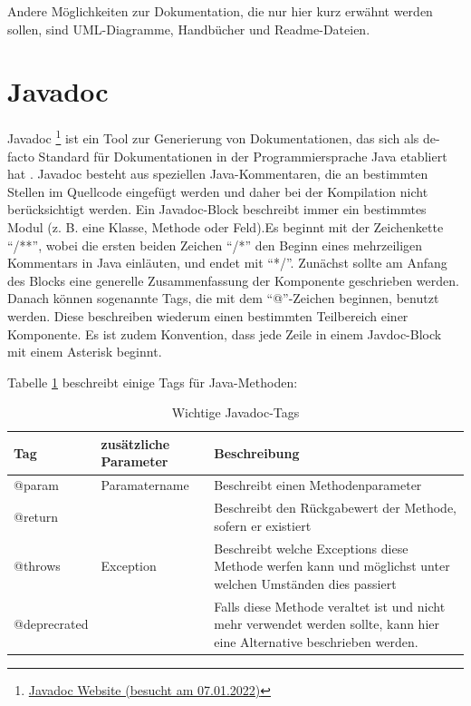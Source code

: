 Andere Möglichkeiten zur Dokumentation, die nur hier kurz erwähnt werden sollen, sind UML-Diagramme, Handbücher und  Readme-Dateien.



\section{Javadoc}
Javadoc \footnote{\href{https://www.oracle.com/java/technologies/javase/javadoc-tool.html}{Javadoc Website (besucht am 07.01.2022)} } ist ein Tool zur Generierung von Dokumentationen, das sich als de-facto Standard für Dokumentationen in der Programmiersprache Java etabliert hat \cite[S. 249]{JavadocViolationsandTheirEvolutioninOpen-SourceSoftware}.  Javadoc besteht aus speziellen Java-Kommentaren, die an bestimmten Stellen im Quellcode eingefügt werden und daher bei der Kompilation nicht berücksichtigt werden. Ein Javadoc-Block beschreibt immer ein bestimmtes Modul (z. B. eine Klasse, Methode oder Feld).Es beginnt mit der Zeichenkette \enquote{/**}, wobei die ersten beiden Zeichen \enquote{/*} den Beginn eines mehrzeiligen Kommentars in Java einläuten, und endet mit \enquote{*/}. Zunächst sollte am Anfang des Blocks eine generelle Zusammenfassung der Komponente geschrieben werden. Danach können sogenannte Tags, die mit dem \enquote{@}-Zeichen beginnen, benutzt werden. Diese beschreiben wiederum einen bestimmten Teilbereich einer Komponente. Es ist zudem Konvention, dass jede Zeile in einem Javdoc-Block mit einem Asterisk beginnt. 

Tabelle \ref{tab:table_javadoc_method} beschreibt einige Tags für Java-Methoden:
\begin{table}[h]
    \centering
    \begin{tabular}{m{4cm}|m{4cm}|m{7cm}}
    Tag & zusätzliche Parameter &Beschreibung\\
    \hline
        @param  & Paramatername & Beschreibt einen Methodenparameter\\
        \hline
         @return & & Beschreibt den Rückgabewert der Methode, sofern er existiert \\
         \hline
         @throws &Exception & Beschreibt welche Exceptions diese Methode werfen kann und möglichst unter welchen Umständen dies passiert \\
           \hline
         @deprecrated & & Falls diese Methode veraltet ist und nicht mehr verwendet werden sollte, kann hier eine Alternative beschrieben werden. \\
           \hline
         
           \hline
         
         
         
         
    \end{tabular}
    \caption{Wichtige Javadoc-Tags}
    \label{tab:table_javadoc_method}
\end{table}

